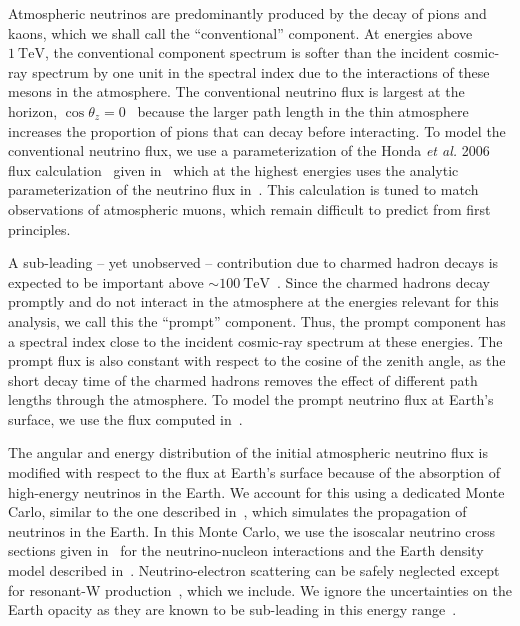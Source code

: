 Atmospheric neutrinos are predominantly produced by the decay of pions and kaons, which we shall call the ``conventional'' component.
At energies above $\SI{1}\TeV$, the conventional component spectrum is softer than the incident cosmic-ray spectrum by one unit in the spectral index due to the interactions of these mesons in the atmosphere.
The conventional neutrino flux is largest at the horizon, $\cos\theta_z=0$~\cite{Gaisser:2002jj,Barr:2004br,Honda:2006qj,Petrova:2012qf} because the larger path length in the thin atmosphere increases the proportion of pions that can decay before interacting.
To model the conventional neutrino flux, we use a parameterization of the Honda {\it{}et al.} 2006 flux calculation~\cite{Honda:2006qj} given in~\cite{Montaruli:2011as} which at the highest energies uses the analytic parameterization of the neutrino flux in~\cite{Gaisser:2002jj}.
This calculation is tuned to match observations of atmospheric muons, which remain difficult to predict from first principles.

A sub-leading -- yet unobserved -- contribution due to charmed hadron decays is expected to be important above $\sim\SI{100}\TeV$~\cite{Bhattacharya:2015jpa}.
Since the charmed hadrons decay promptly and do not interact in the atmosphere at the energies relevant for this analysis, we call this the ``prompt'' component.
Thus, the prompt component has a spectral index close to the incident cosmic-ray spectrum at these energies.
The prompt flux is also constant with respect to the cosine of the zenith angle, as the short decay time of the charmed hadrons removes the effect of different path lengths through the atmosphere.
To model the prompt neutrino flux at Earth's surface, we use the flux computed in~\cite{Bhattacharya:2015jpa}.

The angular and energy distribution of the initial atmospheric neutrino flux is modified with respect to the flux at Earth's surface because of the absorption of high-energy neutrinos in the Earth.
We account for this using a dedicated Monte Carlo, similar to the one described in~\cite{Gazizov:2004va}, which simulates the propagation of neutrinos in the Earth.
In this Monte Carlo, we use the isoscalar neutrino cross sections given in~\cite{CooperSarkar:2011pa} for the neutrino-nucleon interactions and the Earth density model described in~\cite{Dziewonski:1981xy}.
Neutrino-electron scattering can be safely neglected except for resonant-W production~\cite{Glashow:1960zz}, which we include.
We ignore the uncertainties on the Earth opacity as they are known to be sub-leading in this energy range~\cite{Gandhi:1995tf,CooperSarkar:2011pa,Vincent:2017svp}.

